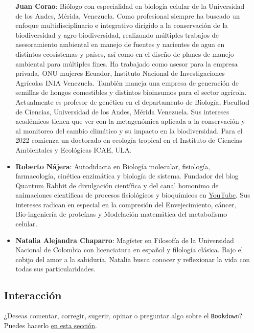 \documentclass[
  12pt, krantz2,
  spanish,
]{krantz}
\begin{document}
\begin{itemize}
  \textbf{Juan Corao}: Biólogo con especialidad en biología celular de la Universidad de los Andes, Mérida, Venezuela. Como profesional siempre ha buscado un enfoque multidisciplinario e integrativo dirigido a la conservación de la biodiversidad y agro-biodiversidad, realizando múltiples trabajos de asesoramiento ambiental en manejo de fuentes y nacientes de agua en distintos ecosistemas y países, así como en el diseño de planes de manejo ambiental para múltiples fines. Ha trabajado como asesor para la empresa privada, ONU mujeres Ecuador, Instituto Nacional de Investigaciones Agrícolas INIA Venezuela. También maneja una empresa de generación de semillas de hongos comestibles y distintos bioinsumos para el sector agrícola. Actualmente es profesor de genética en el departamento de Biología, Facultad de Ciencias, Universidad de los Andes, Mérida Venezuela. Sus intereses académicos tienen que ver con la metagenómica aplicada a la conservación y al monitoreo del cambio climático y su impacto en la biodiversidad. Para el 2022 comienza un doctorado en ecología tropical en el Instituto de Ciencias Ambientales y Ecológicas ICAE, ULA.
\item
  \textbf{Roberto Nájera}: Autodidacta en Biología molecular, fisiología, farmacología, cinética enzimática y biología de sistema. Fundador del blog \href{https://www.facebook.com/Medicina88}{Quantum Rabbit} de divulgación científica y del canal homonimo de animaciones científicas de procesos fisiológicos y bioquímicos en \href{https://www.youtube.com/channel/UC21O3WpoUEXuu6ZmvkFHOCA}{YouTube}. Sus intereses radican en especial en la compresión del Envejecimiento, cáncer, Bio-ingeniería de proteínas y Modelación matemática del metabolismo celular.
\item
  \textbf{Natalia Alejandra Chaparro}: Magíster en Filosofía de la Universidad Nacional de Colombia con licenciatura en español y filología clásica. Bajo el cobijo del amor a la sabiduría, Natalia busca conocer y reflexionar la vida con todas sus particularidades.
\end{itemize}

\hypertarget{interacciuxf3n}{%
\subsection*{Interacción}\label{interacciuxf3n}}

¿Deseas comentar, corregir, sugerir, opinar o preguntar algo sobre el \texttt{Bookdown}? Puedes hacerlo \href{https://github.com/AimerGDiaz/Bio-Virologia/discussions/10}{en esta sección}.
\end{document}
